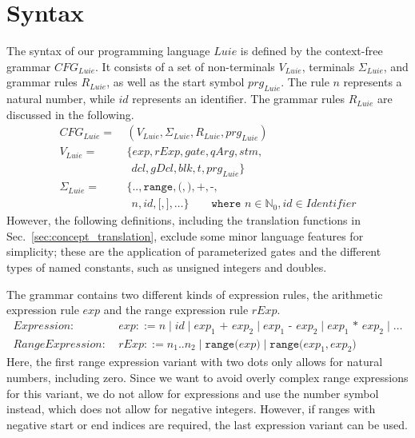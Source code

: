 \section{Syntax}
\label{sec:concept_abstractGrammar}
The syntax of our programming language $Luie$ is defined by the context-free grammar $CFG_{Luie}$. It consists of a set of non-terminals $V_{Luie}$, terminals $\Sigma_{Luie}$, and grammar rules $R_{Luie}$, as well as the start symbol $prg_{Luie}$. The rule $n$ represents a natural number, while $id$ represents an identifier. The grammar rules $R_{Luie}$ are discussed in the following. 
\begin{align*}
    CFG_{Luie} = \ & (V_{Luie}, \Sigma_{Luie}, R_{Luie}, prg_{Luie} )\\ 
    V_{Luie} = \ & \{ exp, rExp, gate,  qArg, stm,\\ 
    & \ \  dcl, gDcl, blk, t, prg_{Luie} \}\\ 
    \Sigma_{Luie} = \ & \{\texttt{..}, \texttt{range}, \texttt{(}, \texttt{)}, \texttt{+}, \texttt{-}, \\
    & \ \  n, id, \texttt{[}, \texttt{]}, \dots \} 
    \quad \quad \texttt{where } n \in \mathbb{N}_0, id \in Identifier
\end{align*}
However, the following definitions, including the translation functions in Sec.~\ref{sec:concept_translation}, exclude some minor language features for simplicity; these are the application of parameterized gates and the different types of named constants, such as unsigned integers and doubles.

The grammar contains two different kinds of expression rules, the arithmetic expression rule $exp$ and the range expression rule $rExp$.
\begin{align*}
    Expression: \ & exp ::= n \mid id \mid exp_1 \texttt{ + } exp_2 \mid exp_1 \texttt{ - } exp_2 \mid exp_1 \texttt{ * } exp_2 \mid \dots\\
    RangeExpression: \ & rExp ::= n_1 .. n_2 \mid \texttt{range(} exp \texttt{)} \mid \texttt{range(} exp_1, exp_2 \texttt{)}
\end{align*}
Here, the first range expression variant with two dots only allows for natural numbers, including zero. Since we want to avoid overly complex range expressions for this variant, we do not allow for expressions and use the number symbol instead, which does not allow for negative integers. However, if ranges with negative start or end indices are required, the last expression variant can be used. 


